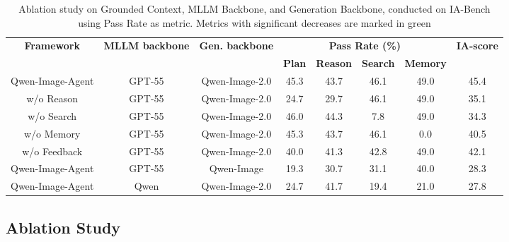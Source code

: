 \documentclass{llmxive}
\providecommand{\arraystretch}{1.12}
\begin{document}
\begin{table}[t]
\centering
\fontsize{8.5pt}{10pt}\selectfont
\setlength{\tabcolsep}{3.5pt}
\renewcommand{\arraystretch}{1.05}
\begin{tabular}{ccc|cccc|c}
\toprule
\multirow{2}{*}{\textbf{Framework}} & \multirow{2}{*}{\textbf{MLLM backbone}} & \multirow{2}{*}{\textbf{Gen. backbone}}
& \multicolumn{4}{c|}{\textbf{Pass Rate (\%)}} 
& \multirow{2}{*}{\textbf{IA-score}} \\
\cmidrule(lr){4-7}
& & & \textbf{Plan} & \textbf{Reason} & \textbf{Search} & \textbf{Memory} & \\

\midrule
Qwen-Image-Agent & GPT-55 & Qwen-Image-2.0
& 45.3 & 43.7 & 46.1 & 49.0 & 45.4 \\
w/o Reason & GPT-55 & Qwen-Image-2.0
& 24.7 & 29.7 & 46.1 & 49.0 & 35.1 \\
w/o Search & GPT-55 & Qwen-Image-2.0
& 46.0 & 44.3 & 7.8 & 49.0 & 34.3 \\
w/o Memory & GPT-55 & Qwen-Image-2.0
& 45.3 & 43.7 & 46.1 & 0.0 & 40.5 \\
w/o Feedback & GPT-55 & Qwen-Image-2.0
& 40.0 & 41.3 & 42.8 & 49.0 & 42.1 \\

\midrule
Qwen-Image-Agent & GPT-55 & Qwen-Image
& 19.3 & 30.7 & 31.1 & 40.0 & 28.3 \\

Qwen-Image-Agent & Qwen & Qwen-Image-2.0
& 24.7 & 41.7 & 19.4 & 21.0 & 27.8 \\
\bottomrule
\end{tabular}
\caption{Ablation study on Grounded Context, MLLM Backbone, and Generation Backbone, conducted on IA-Bench using Pass Rate as metric. Metrics with significant decreases are marked in green}
\label{tab:ablation}
\end{table}
\subsection{Ablation Study}
\end{document}

